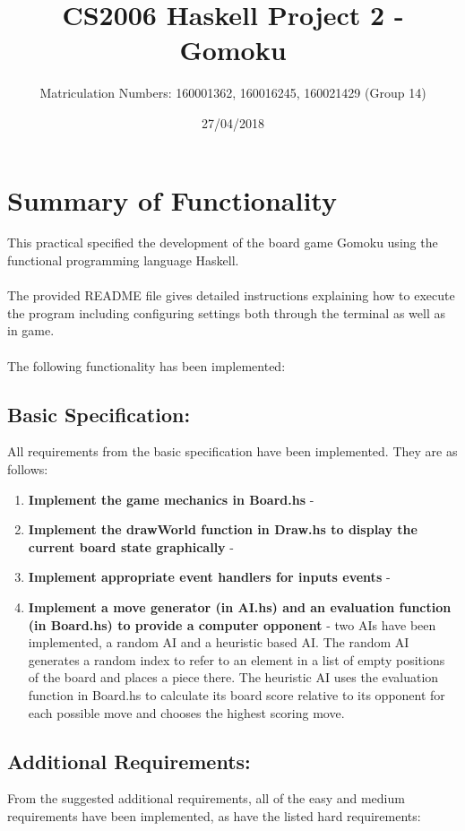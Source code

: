 \documentclass[11]{article}
\title{CS2006 Haskell Project 2 - \\ Gomoku}
\date{27/04/2018}
\author{Matriculation Numbers: 160001362, 160016245, 160021429 (Group 14)}
\begin{document}
	\maketitle
	\newpage
	\tableofcontents
	
	\newpage
	\section{Summary of Functionality}
		This practical specified the development of the board game Gomoku using the functional programming language Haskell. \\\\The provided README file gives detailed instructions explaining how to execute the program including configuring settings both through the terminal as well as in game.
\\\\The following functionality has been implemented:
	\subsection{Basic Specification:}
		All requirements from the basic specification have been implemented. They are as follows:	
		\begin{enumerate}
			\item \textbf{Implement the game mechanics in Board.hs} -
			\item \textbf{Implement the drawWorld function in Draw.hs to display the current board state graphically} -
			\item \textbf{Implement appropriate event handlers for inputs events} -
			\item \textbf{Implement a move generator (in AI.hs) and an evaluation function (in Board.hs) to provide a computer opponent} - two AIs have been implemented, a random AI and a heuristic based AI. The random AI generates a random index to refer to an element in a list of empty positions of the board and places a piece there. The heuristic AI uses the evaluation function in Board.hs to calculate its board score relative to its opponent for each possible move and chooses the highest scoring move.
		\end{enumerate}
	
	\subsection{Additional Requirements:}
	 From the suggested additional requirements, all of the easy and medium requirements have been implemented, as have the listed hard requirements:
\end{document}
